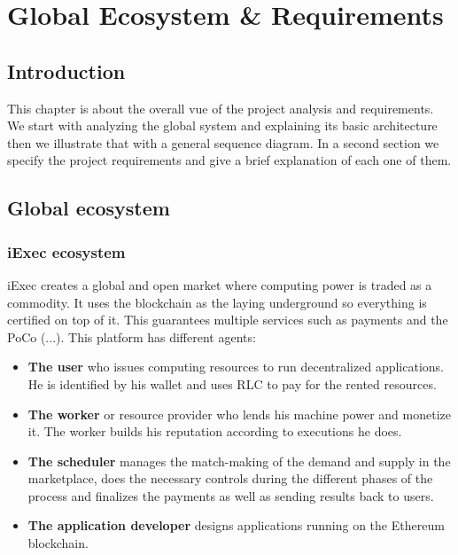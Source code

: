 

\chapter{Global Ecosystem \& Requirements}

\section{Introduction}
    This chapter is about the overall vue of the project analysis and requirements.
    We start with analyzing the global system and explaining its basic architecture then we illustrate that with a general
    sequence diagram. In a second section we specify the project requirements and give a brief explanation of each one of
    them.

\section{Global ecosystem}

    \subsection{iExec ecosystem}
        iExec creates a global and open market where computing power is traded as a commodity. It uses the blockchain
        as the laying underground so everything is certified on top of it. This guarantees multiple services such as
        payments and the PoCo (...).
        This platform has different agents\cite{iexec-architecture}:
        \begin{itemize}
            \item \textbf{The user} who issues computing resources to run decentralized applications. He is identified by
            his wallet and uses RLC to pay for the rented resources.

            \item \textbf{The worker} or resource provider who lends his machine power and monetize it. The worker builds his
            reputation according to executions he does.
            
            \item \textbf{The scheduler} manages the match-making of the demand and supply in the marketplace, does the
            necessary controls during the different phases of the process and finalizes the payments as well as sending
            results back to users.

            \item \textbf{The application developer} designs applications running on the Ethereum\cite{ethereum} blockchain.
        \end{itemize}

